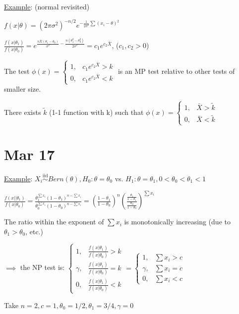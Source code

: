 \documentclass{article}
\let\Oldsum=\sum
\renewcommand{\sum}{\Oldsum\limits}
\newcommand{\iiddist}{\overset{\mathrm{iid}}{\sim}}
\begin{document}
\underline{Example}: (normal revisited)

$f(x|\theta) = (2\pi \sigma^2)^{-n/2}e^{-\frac{1}{2\sigma^2}\sum(x_i - \theta)^2}$

$\frac{f(x|\theta_1)}{f(x|\theta_0)} = e^{\frac{n\bar{X}(\theta_1 - \theta_0)}{\sigma^2} - \frac{n(\theta_1^2 - \theta_0^2)}{2\sigma^2}} = c_1 e^{c_2\bar{X}}$, ($c_1, c_2 > 0$)

The test $\phi(x) = \begin{cases} 1, & c_1 e^{c_2 \bar{X}} > k \\ 0, & c_1 e^{c_2 \bar{X}} < k \end{cases}$ is an MP test relative to other tests of smaller size. 

There exists $\tilde{k}$ (1-1 function with k) such that $\phi(x) = \begin{cases} 1, & \bar{X} > \tilde{k} \\ 0, & \bar{X} < \tilde{k} \end{cases}$


\section{Mar 17}

\underline{Example}: $X_i \iiddist Bern(\theta), H_0: \theta = \theta_0$ vs. $H_1: \theta = \theta_1, 0 < \theta_0 < \theta_1 < 1$

$\frac{f(x||\theta_1)}{f(x|\theta_0)} = \frac{\theta_1^{\sum x_i}(1-\theta_1)^{n-\sum x_i}}{\theta_0^{\sum x_i}(1-\theta_0)^{n-\sum x_i}} = \left( \frac{1 - \theta_1}{1 - \theta_0} \right)^n \left( \frac{\frac{\theta_1}{1-\theta_1}}{\frac{\theta_0}{1-\theta_0}} \right)^{\sum x_i}$

The ratio within the exponent of $\sum x_i$ is monotonically increasing (due to $\theta_1 > \theta_0$, etc.)

$\implies$ the NP test is: $\begin{cases} 1, & \frac{f(x|\theta_1)}{f(x|\theta_0)} > k \\ \gamma, & \frac{f(x|\theta_1)}{f(x|\theta_0)} = k \\ 0, & \frac{f(x|\theta_1)}{f(x|\theta_0)} < k \end{cases} = \begin{cases} 1, & \sum x_i > c \\ \gamma, & \sum x_i = c \\ 0, & \sum x_i < c \end{cases}$

Take $n=2, c=1, \theta_0 = 1/2, \theta_1 = 3/4, \gamma = 0$
\end{document}
